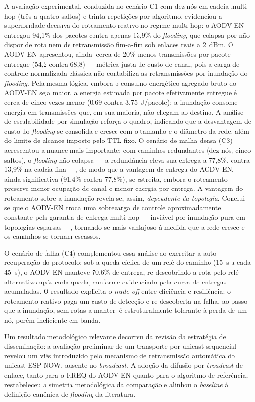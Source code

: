 A avaliação experimental, conduzida no cenário C1 com dez nós em cadeia multi-hop (três
a quatro saltos) e trinta repetições por algoritmo, evidenciou a superioridade decisiva
do roteamento reativo no regime multi-hop: o AODV-EN entregou 94,1\% dos pacotes contra
apenas 13,9\% do \emph{flooding}, que colapsa por não dispor de rota nem de
retransmissão fim-a-fim sob enlaces reais a 2~dBm. O AODV-EN apresentou, ainda, cerca de
20\% menos transmissões por pacote entregue (54,2 contra 68,8) --- métrica justa de custo
de canal, pois a carga de controle normalizada clássica não contabiliza as
retransmissões por inundação do \emph{flooding}. Pela mesma lógica, embora o consumo
energético agregado bruto do AODV-EN seja maior, a energia estimada por pacote
efetivamente entregue é cerca de cinco vezes menor (0,69 contra 3,75~J/pacote): a inundação
consome energia em transmissões que, em sua maioria, não chegam ao destino. A análise de
escalabilidade por simulação reforça o quadro, indicando que a desvantagem de custo do
\emph{flooding} se consolida e cresce com o tamanho e o diâmetro da rede, além do limite
de alcance imposto pelo TTL fixo. O cenário de malha densa (C3) acrescentou a nuance mais
importante: com caminhos redundantes (dez nós, cinco saltos), o \emph{flooding} não colapsa
--- a redundância eleva sua entrega a 77,8\%, contra 13,9\% na cadeia fina ---, de modo que
a vantagem de entrega do AODV-EN, ainda significativa (91,4\% contra 77,8\%), se estreita,
embora o roteamento preserve menor ocupação de canal e menor energia por entrega. A
vantagem do roteamento sobre a inundação revela-se, assim, \emph{dependente da topologia}.
Conclui-se que o AODV-EN troca uma sobrecarga de controle aproximadamente constante pela
garantia de entrega multi-hop --- inviável por inundação pura em topologias esparsas ---,
tornando-se mais vantajoso à medida que a rede cresce e os caminhos se tornam escassos.

O cenário de falha (C4) complementou essa análise ao exercitar a auto-recuperação do
protocolo: sob a queda cíclica de um relé do caminho (15~s a cada 45~s), o AODV-EN
manteve 70,6\% de entrega, re-descobrindo a rota pelo relé alternativo após cada queda,
conforme evidenciado pela curva de entregas acumuladas. O resultado explicita o
\emph{trade-off} entre eficiência e resiliência: o roteamento reativo paga um custo de
detecção e re-descoberta na falha, ao passo que a inundação, sem rotas a manter, é
estruturalmente tolerante à perda de um nó, porém ineficiente em banda.

Um resultado metodológico relevante decorreu da revisão da estratégia de disseminação:
a avaliação preliminar de um transporte por unicast sequencial revelou um viés
introduzido pelo mecanismo de retransmissão automática do unicast ESP-NOW, ausente no
\emph{broadcast}. A adoção da difusão por \emph{broadcast} de enlace, tanto para o
RREQ do AODV-EN quanto para o algoritmo de referência, restabeleceu a simetria
metodológica da comparação e alinhou o \emph{baseline} à definição canônica de
\emph{flooding} da literatura.

